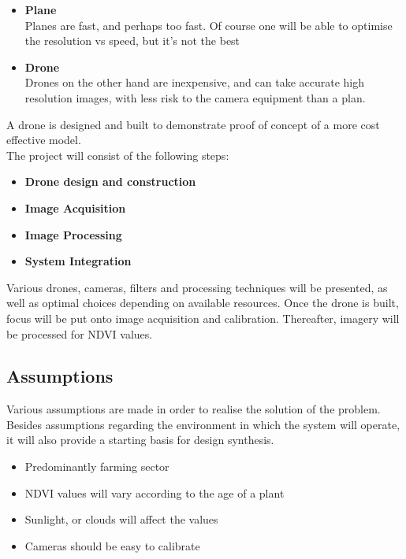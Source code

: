 \begin{itemize}
    \item \textbf{Plane}\\
    Planes are fast, and perhaps too fast. Of course one will be able to optimise the resolution vs speed, but it's not the best
    \item \textbf{Drone}\\
    Drones on the other hand are inexpensive, and can take accurate high resolution images, with less risk to the camera equipment than a plan.
\end{itemize}

A drone is designed and built to demonstrate proof of concept of a more cost effective model.\\

\noindent
The project will consist of the following steps:
\begin{itemize}
    \item \textbf{Drone design and construction}
    \item \textbf{Image Acquisition}
    \item \textbf{Image Processing}
    \item \textbf{System Integration}
\end{itemize}

\noindent
Various drones, cameras, filters and processing techniques will be presented, as well as optimal choices depending on available resources.
Once the drone is built, focus will be put onto image acquisition and calibration. Thereafter, imagery will be processed for NDVI values.

\subsection{Assumptions}

Various assumptions are made in order to realise the solution of the problem. Besides assumptions regarding the environment in which the system will operate, it will also provide a starting basis for design synthesis.

\begin{itemize}
    \item Predominantly farming sector
    \item NDVI values will vary according to the age of a plant
    \item Sunlight, or clouds will affect the values
    \item Cameras should be easy to calibrate
\end{itemize}

